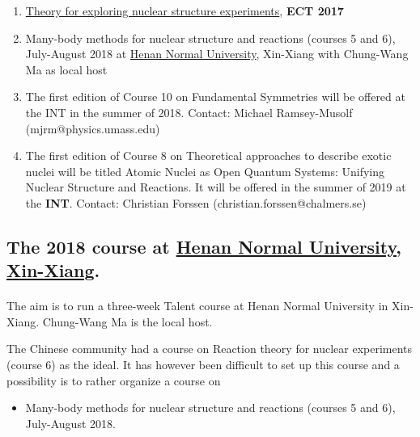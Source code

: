 \documentclass[%
oneside,                 %
final,                   %
10pt]{article}
\begin{document}
\begin{enumerate}
\item \href{{https://github.com/NuclearTalent/NuclearStructure}}{Theory for exploring nuclear structure experiments}, \textbf{ECT 2017}

\item Many-body methods for nuclear structure and reactions (courses 5 and 6), July-August 2018 at \href{{http://www.htu.cn/english/}}{Henan Normal University}, Xin-Xiang with Chung-Wang Ma as local host

\item The first edition of Course 10 on Fundamental Symmetries will be offered at the INT in the summer of 2018. Contact: Michael Ramsey-Musolf (mjrm@physics.umass.edu)

\item The first edition of Course 8 on Theoretical approaches to describe exotic nuclei will be titled Atomic Nuclei as Open Quantum Systems: Unifying Nuclear Structure and Reactions. It will be offered in the summer of 2019 at the \textbf{INT}. Contact: Christian Forssen (christian.forssen@chalmers.se)
\end{enumerate}

\noindent





\subsection{The 2018 course at \href{{http://www.htu.cn/english/}}{Henan Normal University, Xin-Xiang}.}

\paragraph{}
The aim is to run a three-week Talent course at Henan Normal University in Xin-Xiang. Chung-Wang Ma is the local host. 

The Chinese community had a course on Reaction theory for nuclear experiments (course 6) as the ideal. It has however been difficult to set up this course and a possibility is to rather organize a course on

\begin{itemize}
\item Many-body methods for nuclear structure and reactions (courses 5 and 6), July-August 2018.
\end{itemize}
\end{document}
